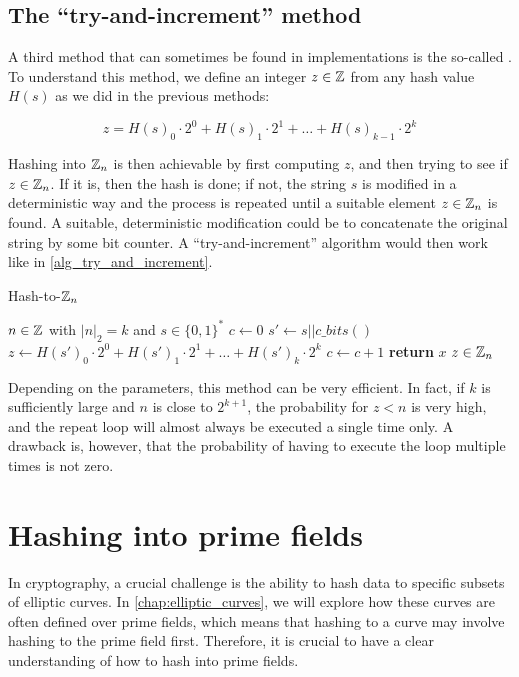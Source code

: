 \subsection{The ``try-and-increment'' method}\label{def:try_and_increment_hash}

A third method that can sometimes be found in implementations is the so-called . To understand this method, we define an integer $z\in\mathbb{Z}$ from any hash value $H(s)$ as we did in the previous methods:

\begin{equation}
z = H(s)_0\cdot 2^0 + H(s)_1\cdot 2^1 + \ldots + H(s)_{k-1}\cdot 2^{k}
\end{equation}

Hashing into $\mathbb{Z}_n$ is then achievable by first computing $z$, and then trying to see if $z\in\mathbb{Z}_n$. If it is, then the hash is done; if not, the string $s$ is modified in a deterministic way and the process is repeated until a suitable element $z\in\mathbb{Z}_n$ is found. A suitable, deterministic modification could be to concatenate the original string by some bit counter. A ``try-and-increment'' algorithm would then work like in \algname{} \ref{alg_try_and_increment}.
\begin{algorithm}\caption{Hash-to-$\mathbb{Z}_n$}
\label{alg_try_and_increment}
\begin{algorithmic}[0]
\Require $n \in \mathbb{Z}$ with $|n|_2=k$ and $s\in\{0,1\}^*$
\State $c \gets 0$
\Repeat
\State $s' \gets s||c\_bits()$
\State $z \gets H(s')_0\cdot 2^0 + H(s')_1\cdot 2^1 + \ldots + H(s')_{k}\cdot 2^{k}$
\State $c\gets c+1$
\State \textbf{return} $x$
\EndProcedure
\Ensure $ z\in \mathbb{Z}_n$
\end{algorithmic}
\end{algorithm}

Depending on the parameters, this method can be very efficient. In fact, if $k$ is sufficiently large and $n$ is close to $2^{k+1}$, the probability for $z<n$ is very high, and the repeat loop will almost always be executed a single time only. A drawback is, however, that the probability of having to execute the loop multiple times is not zero.


\section{Hashing into prime fields}\label{hashing-prime-fields}
In cryptography, a crucial challenge is the ability to hash data to specific subsets of elliptic curves. In \ref{chap:elliptic_curves}, we will explore how these curves are often defined over prime fields, which means that hashing to a curve may involve hashing to the prime field first. Therefore, it is crucial to have a clear understanding of how to hash into prime fields.

